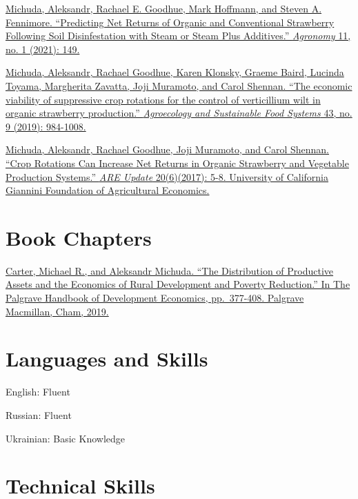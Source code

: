\documentclass[
  11pt]{article}
\begin{document}
\href{https://www.mdpi.com/2073-4395/11/1/149}{Michuda, Aleksandr,
Rachael E. Goodhue, Mark Hoffmann, and Steven A. Fennimore. ``Predicting
Net Returns of Organic and Conventional Strawberry Following Soil
Disinfestation with Steam or Steam Plus Additives.'' \emph{Agronomy} 11,
no. 1 (2021): 149.}

\href{https://www.tandfonline.com/doi/full/10.1080/21683565.2018.1552228?casa_token=uUSSMSYYz8kAAAAA\%3Ak9RAJxZUEeAcikUZH9G-o5hGAd21QvhnQVWkPpecl--ZYyfr0R10XscXW60Ohs4KF7S5S2Pa_HFp}{Michuda,
Aleksandr, Rachael Goodhue, Karen Klonsky, Graeme Baird, Lucinda Toyama,
Margherita Zavatta, Joji Muramoto, and Carol Shennan. ``The economic
viability of suppressive crop rotations for the control of verticillium
wilt in organic strawberry production.'' \emph{Agroecology and
Sustainable Food Systems} 43, no. 9 (2019): 984-1008.}

\href{https://giannini.ucop.edu/publications/are-update/issues/2017/20/6/crop-rotations-can-increase-net-returns-in-organic/}{Michuda,
Aleksandr, Rachael Goodhue, Joji Muramoto, and Carol Shennan. ``Crop
Rotations Can Increase Net Returns in Organic Strawberry and Vegetable
Production Systems.'' \emph{ARE Update} 20(6)(2017): 5-8. University of
California Giannini Foundation of Agricultural Economics.}

\hypertarget{book-chapters}{%
\section{Book Chapters}\label{book-chapters}}

\href{https://link.springer.com/chapter/10.1007/978-3-030-14000-7_11}{Carter,
Michael R., and Aleksandr Michuda. ``The Distribution of Productive
Assets and the Economics of Rural Development and Poverty Reduction.''
In The Palgrave Handbook of Development Economics, pp.~377-408. Palgrave
Macmillan, Cham, 2019.}

\hypertarget{languages-and-skills}{%
\section{Languages and Skills}\label{languages-and-skills}}

English: Fluent

Russian: Fluent

Ukrainian: Basic Knowledge

\hypertarget{technical-skills}{%
\section{Technical Skills}\label{technical-skills}}
\end{document}
